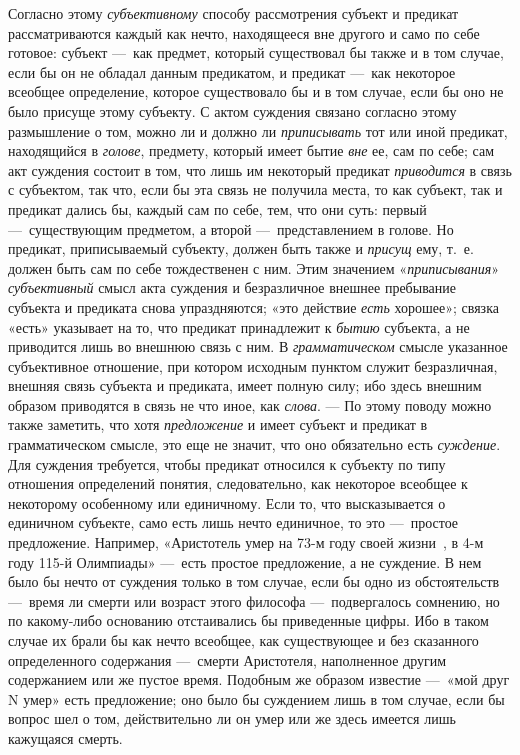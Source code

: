 \documentclass[twoside]{article}
\begin{document}
{{{{Согласно этому
{\em субъективному}
способу рассмотрения субъект и предикат рассматриваются
каждый как нечто, находящееся вне другого и само по себе готовое: субъект
—~как предмет, который существовал бы также и в том случае,
если бы он не обладал данным предикатом, и предикат —~как
некоторое всеобщее определение, которое существовало бы и в том случае,
если бы оно не было присуще этому субъекту. С актом суждения связано
согласно этому размышление о том, можно ли и должно ли
{\em приписывать} тот или
иной предикат, находящийся в
{\em голове}, предмету,
который имеет бытие {\em вне}
ее, сам по себе; сам акт суждения состоит в том, что лишь им
некоторый предикат {\em приводится}
в связь с субъектом, так что, если бы эта связь не получила
места, то как субъект, так и предикат дались бы, каждый сам по себе, тем,
что они суть: первый —~существующим предметом, а второй
—~представлением в голове. Но предикат, приписываемый
субъекту, должен быть также и
{\em присущ} ему, т.~е.
должен быть сам по себе тождественен с ним. Этим значением
«{\em приписывания}»
{\em субъективный} смысл
акта суждения и безразличное внешнее пребывание субъекта и предиката снова
упраздняются; «это действие {\em есть}
хорошее»; связка «есть» указывает на то, что предикат
принадлежит к {\em бытию}
субъекта, а не приводится лишь во внешнюю связь с ним. В
{\em грамматическом}
смысле указанное субъективное отношение, при котором исходным
пунктом служит безразличная, внешняя связь субъекта и предиката, имеет
полную силу; ибо здесь внешним образом приводятся в связь не что иное, как
{\em слова}. — По этому
поводу можно также заметить, что хотя
{\em предложение} и имеет
субъект и предикат в грамматическом смысле, это еще не значит, что оно
обязательно есть {\em суждение}.
Для суждения требуется, чтобы предикат относился к субъекту
по типу отношения определений понятия, следовательно, как некоторое
всеобщее к некоторому особенному или единичному. Если то,
что высказывается о единичном субъекте, само есть лишь нечто единичное, то
это —~простое предложение. Например, «Аристотель умер на
73-м году своей
жизни~\label{bkm:bm28},
в 4-м году 115-й Олимпиады» —~есть простое
предложение, а не суждение. В нем было бы нечто от суждения только в том
случае, если бы одно из обстоятельств —~время ли смерти или
возраст этого философа —~подвергалось сомнению, но по
какому-либо основанию отстаивались бы приведенные цифры. Ибо в таком случае
их брали бы как нечто всеобщее, как существующее и без сказанного
определенного содержания —~смерти Аристотеля, наполненное
другим содержанием или же пустое время. Подобным же образом известие
—~«мой друг N умер» есть предложение; оно было бы суждением
лишь в том случае, если бы вопрос шел о том, действительно ли он умер или
же здесь имеется лишь кажущаяся смерть.

}}}}
\end{document}
